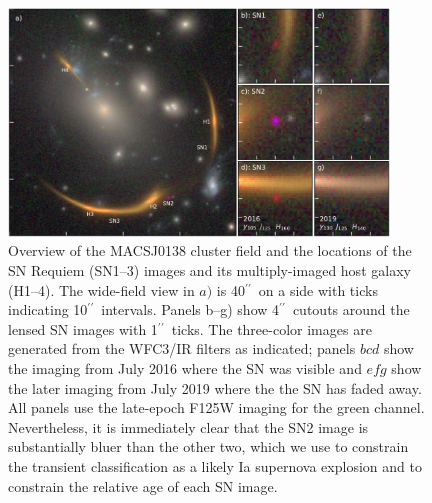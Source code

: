 \documentclass[12pt,dvipsnames]{article}
\gdef\arcsec{$^{\prime\prime}$}
\begin{document}

\clearpage
\begin{figure}
    \centering
    \includegraphics[draft=False,width=0.9\textwidth]{Paper/Figures/fig1_layout.pdf}
    \caption{Overview of the MACSJ0138 cluster field and the locations of the SN Requiem (SN1--3) images and its multiply-imaged host galaxy (H1--4). The wide-field view in $a)$ is 40\arcsec\ on a side with ticks indicating 10\arcsec\ intervals.  Panels b--g) show 4\arcsec\ cutouts around the lensed SN images with 1\arcsec\ ticks.  The three-color images are generated from the WFC3/IR filters as indicated; panels $bcd$ show the imaging from July 2016 where the SN was visible and $efg$ show the later imaging from July 2019 where the the SN has faded away.  All panels use the late-epoch F125W imaging for the green channel.  Nevertheless, it is immediately clear that the SN2 image is substantially bluer than the other two, which we use to constrain the transient classification as a likely Ia supernova explosion and to constrain the relative age of each SN image.}
    
    \label{fig:layout}
\end{figure}
\clearpage
\end{document}
